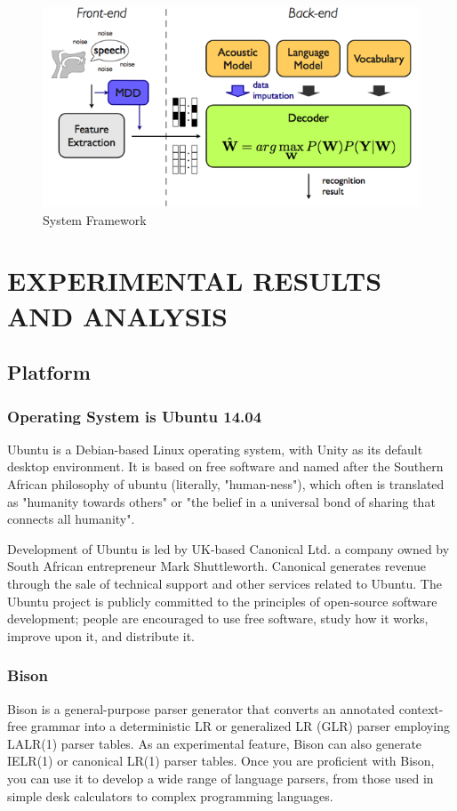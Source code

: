 \documentclass[12pt,a4paper,oldfontcommands]{memoir}
\begin{document}
\begin{figure}[h]
    \centering
    \includegraphics[scale=0.5]{mdt_recognizer}
    \caption{System Framework}
\end{figure}

\chapter{EXPERIMENTAL RESULTS AND ANALYSIS}
\section{Platform}
\subsection{Operating System is Ubuntu 14.04}
Ubuntu is a Debian-based Linux operating system, with Unity as its default desktop environment. It is based on free software and named after the Southern African philosophy of ubuntu (literally, "human-ness"), which often is translated as "humanity towards others" or "the belief in a universal bond of sharing that connects all humanity".

Development of Ubuntu is led by UK-based Canonical Ltd. a company owned by South African entrepreneur Mark Shuttleworth. Canonical generates revenue through the sale of technical support and other services related to Ubuntu. The Ubuntu project is publicly committed to the principles of open-source software development; people are encouraged to use free software, study how it works, improve upon it, and distribute it\cite{9}.
\subsection{Bison}
Bison is a general-purpose parser generator that converts an annotated context-free grammar into a deterministic LR or generalized LR (GLR) parser employing LALR(1) parser tables. As an experimental feature, Bison can also generate IELR(1) or canonical LR(1) parser tables. Once you are proficient with Bison, you can use it to develop a wide range of language parsers, from those used in simple desk calculators to complex programming languages.
\end{document}
